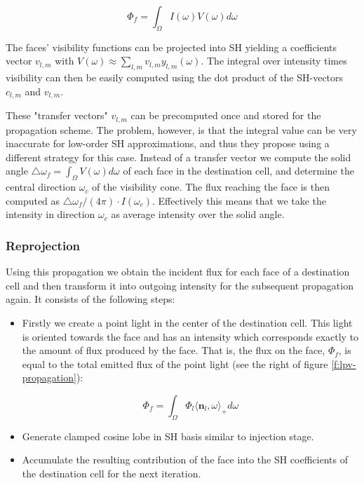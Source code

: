 \begin{equation*}
	\Phi_f=\int_\Omega I(\omega)V(\omega)d\omega
\end{equation*}

The faces' visibility functions can be projected into SH yielding a coefficients vector $v_{l,m}$ with $V(\omega)\approx\sum_{l,m}v_{l,m}y_{l,m}(\omega)$. The integral over intensity times visibility can then be easily computed using the dot product of the SH-vectors $c_{l,m}$ and $v_{l,m}$.

These "transfer vectors" $v_{l,m}$ can be precomputed once and stored for the propagation scheme. The problem, however, is that the integral value can be very inaccurate for low-order SH approximations, and thus they propose using a different strategy for this case. Instead of a transfer vector we compute the solid angle $\triangle\omega_f=\int_\Omega V(\omega)d\omega$ of each face in the destination cell, and determine the central direction $\omega_c$ of the visibility cone. The flux reaching the face is then computed as $\triangle\omega_f/(4\pi)\cdot I(\omega_c)$. Effectively this means that we take the intensity in direction $\omega_c$ as average intensity over the solid angle.




\subsubsection{Reprojection}
Using this propagation we obtain the incident flux for each face of a destination cell and then transform it into outgoing intensity for the subsequent propagation again. It consists of the following steps:

\begin{itemize}
	\item Firstly we create a point light in the center of the destination cell. This light is oriented towards the face and has an intensity which corresponds exactly to the amount of flux produced by the face. That is, the flux on the face, $\Phi_f$, is equal to the total emitted flux of the point light (see the right of figure \ref{f:lpv-propagation}):

		\begin{equation*}
			\Phi_f=\int_\Omega\Phi_l\langle\mathbf{n}_l,\omega\rangle_+d\omega
		\end{equation*}
		
	\item Generate clamped cosine lobe in SH basis similar to injection stage.
	\item Accumulate the resulting contribution of the face into the SH coefficients of the destination cell for the next iteration.
\end{itemize}

